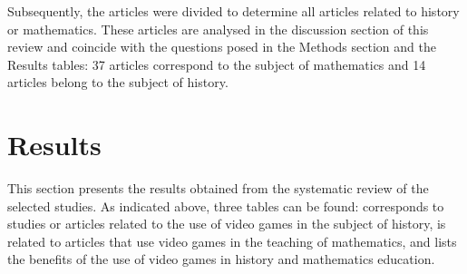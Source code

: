 \documentclass[english]{textolivre}
\begin{document}
Subsequently, the articles were divided to determine all articles related to history or mathematics. These articles are analysed in the discussion section of this review and coincide with the questions posed in the Methods section and the Results tables: 37 articles correspond to the subject of mathematics and 14 articles belong to the subject of history.

\section{Results}\label{sec-conduta}
This section presents the results obtained from the systematic review of the selected studies. As indicated above, three tables can be found:  corresponds to studies or articles related to the use of video games in the subject of history,  is related to articles that use video games in the teaching of mathematics, and  lists the benefits of the use of video games in history and mathematics education.
\end{document}
